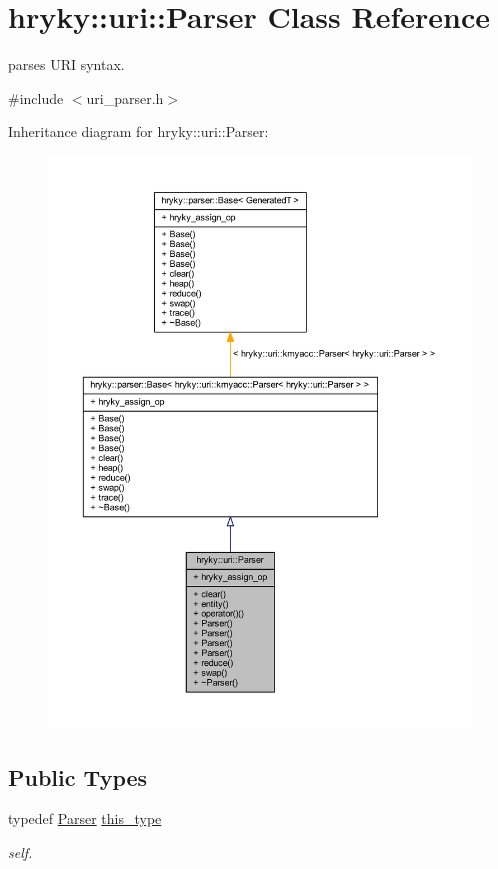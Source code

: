\hypertarget{classhryky_1_1uri_1_1_parser}{\section{hryky\-:\-:uri\-:\-:Parser Class Reference}
\label{classhryky_1_1uri_1_1_parser}
}


parses U\-R\-I syntax.  




{\ttfamily \#include $<$uri\-\_\-parser.\-h$>$}



Inheritance diagram for hryky\-:\-:uri\-:\-:Parser\-:
\nopagebreak
\begin{figure}[H]
\begin{center}
\leavevmode
\includegraphics[width=350pt]{classhryky_1_1uri_1_1_parser__inherit__graph}
\end{center}
\end{figure}
\subsection*{Public Types}
\begin{DoxyCompactItemize}
\item 
\hypertarget{classhryky_1_1uri_1_1_parser_ab16d652331f3a9386278bacd77c167ec}{typedef \hyperlink{classhryky_1_1uri_1_1_parser}{Parser} \hyperlink{classhryky_1_1uri_1_1_parser_ab16d652331f3a9386278bacd77c167ec}{this\-\_\-type}}\label{classhryky_1_1uri_1_1_parser_ab16d652331f3a9386278bacd77c167ec}

\begin{DoxyCompactList}\small\item\em self. \end{DoxyCompactList}\end{DoxyCompactItemize}
